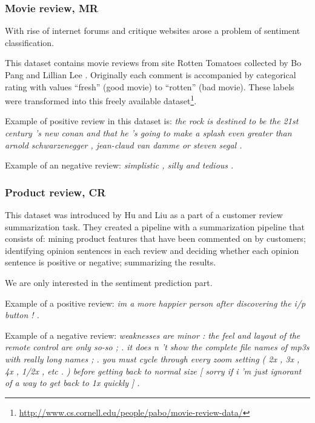     \subsubsection{Movie review, MR}
    
    With rise of internet forums and critique websites arose a problem of sentiment classification.
    
    This dataset contains movie reviews from site Rotten Tomatoes collected by Bo Pang and Lillian Lee \cite{pang2002thumbs}.
    Originally each comment is accompanied by categorical rating with values ``fresh'' (good movie) to ``rotten'' (bad movie). 
    These labels were transformed into this freely available dataset\footnote{\url{http://www.cs.cornell.edu/people/pabo/movie-review-data/}}.
    
    Example of positive review in this dataset is: \emph{the rock is destined to be the 21st century 's new conan and that he 's going to make a splash even greater than arnold schwarzenegger , jean-claud van damme or steven segal .}

    Example of an negative review: \emph{simplistic , silly and tedious .}
    
    \subsubsection{Product review, CR}
    
    This dataset was introduced by Hu and Liu \cite{hu2004mining} as a part of a customer review summarization task. \* %
    They created a pipeline with a summarization pipeline that consists of: mining product features that have been commented on by customers; identifying opinion sentences in each review and deciding whether each opinion sentence is positive or negative;  summarizing  the  results.  
    
    We are only interested in the sentiment prediction part.
    
    Example of a positive review:
    \emph{im a more happier person after discovering the i/p button ! .}

    Example of a negative review:
    \emph{weaknesses are minor : the feel and layout of the remote control are only so-so ; . it does n 't show the complete file names of mp3s with really long names ; . you must cycle through every zoom setting ( 2x , 3x , 4x , 1/2x , etc . ) before getting back to normal size [ sorry if i 'm just ignorant of a way to get back to 1x quickly ] .}

